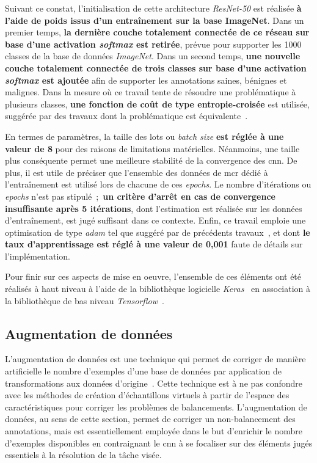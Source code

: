 Suivant ce constat, l'initialisation de cette architecture \textit{ResNet-50} est réalisée \textbf{à l'aide de poids issus d'un entraînement sur la base ImageNet}. Dans un premier temps, \textbf{la dernière couche totalement connectée de ce réseau sur base d'une activation \textit{softmax} est retirée}, prévue pour supporter les 1000 classes de la base de données \textit{ImageNet}. Dans un second temps, \textbf{une nouvelle couche totalement connectée de trois classes sur base d'une activation \textit{softmax} est ajoutée} afin de supporter les annotations saines, bénignes et malignes. Dans la mesure où ce travail tente de résoudre une problématique à plusieurs classes, \textbf{une fonction de coût de type entropie-croisée} est utilisée, suggérée par des travaux dont la problématique est équivalente~\cite{Barbu2016,Park2019}.\par

En termes de paramètres, la taille des lots ou \textit{batch size} \textbf{est réglée à une valeur de 8} pour des raisons de limitations matérielles. Néanmoins, une taille plus conséquente permet une meilleure stabilité de la convergence des \gls{cnn}. De plus, il est utile de préciser que l'ensemble des données de \gls{mcr} dédié à l'entraînement est utilisé lors de chacune de ces \textit{epochs}. Le nombre d'itérations ou \textit{epochs} n'est pas stipulé~;~\textbf{un critère d'arrêt en cas de convergence insuffisante après 5 itérations}, dont l'estimation est réalisée sur les données d'entraînement, est jugé suffisant dans ce contexte. Enfin, ce travail emploie une optimisation de type \textit{adam} tel que suggéré par de précédents travaux~\cite{Barbu2016,Park2019}, et dont \textbf{le taux d'apprentissage est réglé à une valeur de 0,001} faute de détails sur l'implémentation.\par

Pour finir sur ces aspects de mise en oeuvre, l'ensemble de ces éléments ont été réalisés à haut niveau à l'aide de la bibliothèque logicielle \textit{Keras}~\cite{chollet2015} en association à la bibliothèque de bas niveau \textit{Tensorflow}~\cite{Tensorflow2016}.\par

\subsection{Augmentation de données}
L'augmentation de données est une technique qui permet de corriger de manière artificielle le nombre d'exemples d'une base de données par application de transformations aux données d'origine~\cite{Wong2016,Taylor2018}. Cette technique est à ne pas confondre avec les méthodes de création d'échantillons virtuels à partir de l'espace des caractéristiques pour corriger les problèmes de balancements. L'augmentation de données, au sens de cette section, permet de corriger un non-balancement des annotations, mais est essentiellement employée dans le but d'enrichir le nombre d'exemples disponibles en contraignant le \gls{cnn} à se focaliser sur des éléments jugés essentiels à la résolution de la tâche visée.\par

